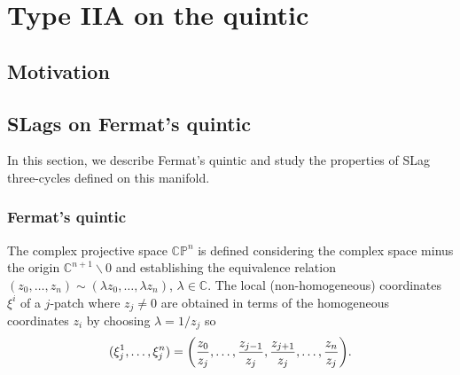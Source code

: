 \chapter{Type IIA on the quintic}

\section{Motivation}

%

\section{SLags on Fermat's quintic}
In this section, we describe Fermat's quintic and study the properties of SLag three-cycles 
defined on this manifold.

\subsection{Fermat's quintic}
The complex projective space $\mathbb{CP}^n$ is defined considering the complex space minus the origin $\mathbb{C}^{n+1}\backslash\qty{0}$
and establishing the equivalence relation $( z_0,\ldots, z_{n})\sim(\lambda z_0,\ldots,\lambda z_{n})$, $\lambda\in\mathbb C$.
The local (non-homogeneous) coordinates $\xi^i$ of a $j$-patch where $z_j\neq0$ are obtained  in
terms of the homogeneous coordinates $z_i$ by choosing $\lambda=1/z_j$ so
\begin{equation}
  (\xi^1_j,\ldots,\xi^n_j)=\qty(\frac{z_0}{z_j},\ldots,\frac{z_{j-1}}{z_j},\frac{z_{j+1}}{z_j},\ldots,\frac{z_{n}}{z_j}).
\end{equation}

